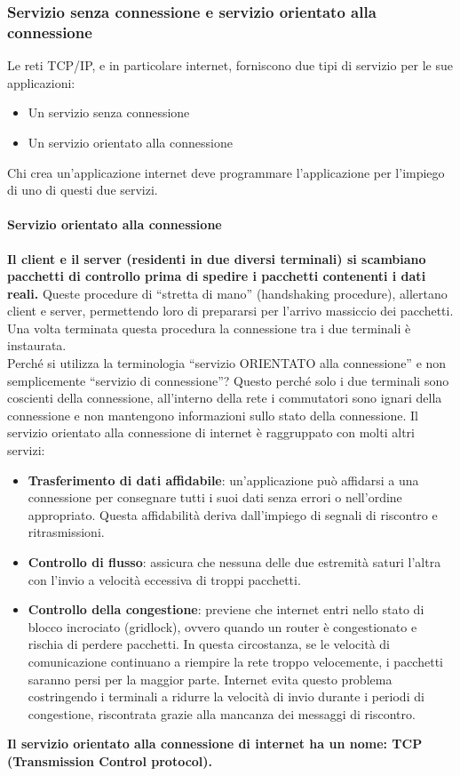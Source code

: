 \documentclass[11pt,a4paper]{article}
\begin{document}
\subsubsection{Servizio senza connessione e servizio orientato alla connessione}
Le reti TCP/IP, e in particolare internet, forniscono due tipi di servizio per le sue applicazioni:
\begin{itemize}
	\item Un servizio senza connessione
	\item Un servizio orientato alla connessione
\end{itemize}
Chi crea un’applicazione internet deve programmare l’applicazione per l’impiego di uno di questi due servizi.
\paragraph{Servizio orientato alla connessione}
\textbf{Il client e il server (residenti in due diversi terminali) si scambiano pacchetti di controllo prima di spedire i pacchetti contenenti i dati reali.} Queste procedure di “stretta di mano” (handshaking procedure), allertano client e server, permettendo loro di prepararsi per l’arrivo massiccio dei pacchetti. Una volta terminata questa procedura la connessione tra i due terminali è instaurata. \\
Perché si utilizza la terminologia “servizio ORIENTATO alla connessione” e non semplicemente “servizio di connessione”? Questo perché solo i due terminali sono coscienti della connessione, all’interno della rete i commutatori sono ignari della connessione e non mantengono informazioni sullo stato della connessione.
Il servizio orientato alla connessione di internet è raggruppato con molti altri servizi:
\begin{itemize}
	\item \textbf{Trasferimento di dati affidabile}: un’applicazione può affidarsi a una connessione per consegnare tutti i suoi dati senza errori o nell’ordine appropriato. Questa affidabilità deriva dall’impiego di segnali di riscontro e ritrasmissioni.
	\item \textbf{Controllo di flusso}: assicura che nessuna delle due estremità saturi l’altra con l’invio a velocità eccessiva di troppi pacchetti.
	\item \textbf{Controllo della congestione}: previene che internet entri nello stato di blocco incrociato (gridlock), ovvero quando un router è congestionato e rischia di perdere pacchetti. In questa circostanza, se le velocità di comunicazione continuano a riempire la rete troppo velocemente, i pacchetti saranno persi per la maggior parte. Internet evita questo problema costringendo i terminali a ridurre la velocità di invio durante i periodi di congestione, riscontrata grazie alla mancanza dei messaggi di riscontro.
\end{itemize}
\textbf{Il servizio orientato alla connessione di internet ha un nome: TCP (Transmission Control protocol).}
\end{document}
